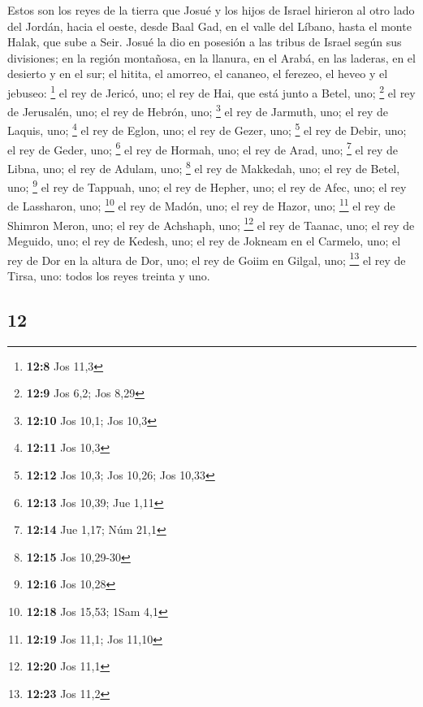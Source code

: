 \begin{paracol}{2}
 Estos son los reyes de la tierra que Josué y los hijos de
Israel hirieron al otro lado del Jordán, hacia el oeste, desde Baal Gad,
en el valle del Líbano, hasta el monte Halak, que sube a Seir. Josué la
dio en posesión a las tribus de Israel según sus divisiones;
 en la región montañosa, en la llanura, en el Arabá, en
las laderas, en el desierto y en el sur; el hitita, el amorreo, el
cananeo, el ferezeo, el heveo y el jebuseo: \footnote{\textbf{12:8} Jos
  11,3}  el rey de Jericó, uno; el rey de Hai, que está
junto a Betel, uno; \footnote{\textbf{12:9} Jos 6,2; Jos 8,29}
 el rey de Jerusalén, uno; el rey de Hebrón, uno;
\footnote{\textbf{12:10} Jos 10,1; Jos 10,3}  el rey de
Jarmuth, uno; el rey de Laquis, uno; \footnote{\textbf{12:11} Jos 10,3}
 el rey de Eglon, uno; el rey de Gezer, uno; \footnote{\textbf{12:12}
  Jos 10,3; Jos 10,26; Jos 10,33}  el rey de Debir, uno;
el rey de Geder, uno; \footnote{\textbf{12:13} Jos 10,39; Jue 1,11}
 el rey de Hormah, uno; el rey de Arad, uno; \footnote{\textbf{12:14}
  Jue 1,17; Núm 21,1}  el rey de Libna, uno; el rey de
Adulam, uno; \footnote{\textbf{12:15} Jos 10,29-30}  el
rey de Makkedah, uno; el rey de Betel, uno; \footnote{\textbf{12:16} Jos
  10,28}  el rey de Tappuah, uno; el rey de Hepher, uno;
 el rey de Afec, uno; el rey de Lassharon, uno;
\footnote{\textbf{12:18} Jos 15,53; 1Sam 4,1}  el rey de
Madón, uno; el rey de Hazor, uno; \footnote{\textbf{12:19} Jos 11,1; Jos
  11,10}  el rey de Shimron Meron, uno; el rey de
Achshaph, uno; \footnote{\textbf{12:20} Jos 11,1}  el rey
de Taanac, uno; el rey de Meguido, uno;  el rey de
Kedesh, uno; el rey de Jokneam en el Carmelo, uno;  el
rey de Dor en la altura de Dor, uno; el rey de Goiim en Gilgal, uno;
\footnote{\textbf{12:23} Jos 11,2}  el rey de Tirsa, uno:
todos los reyes treinta y uno.

\switchcolumn
\begin{otherlanguage}{english}

\hypertarget{section-23}{%
\section{12}\label{section-23}}


\end{otherlanguage}
\end{paracol}
